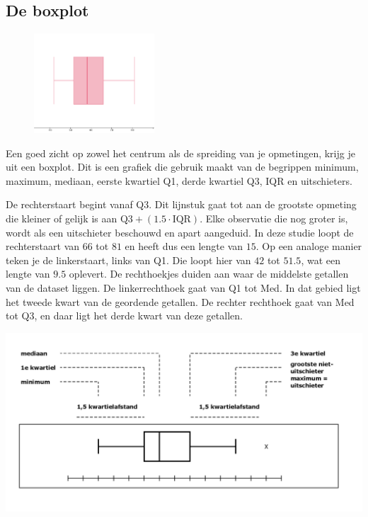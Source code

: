 \documentclass[12pt,twoside,a4paper]{article}
\begin{document}
\needspace{8cm}
\subsection{De boxplot}

\begin{figure}
  \vspace{-1cm}
  \includegraphics[width=0.4\textwidth]{boxplot}
\end{figure}

Een goed zicht op zowel het centrum als de spreiding van je opmetingen, krijg je uit een boxplot. Dit
is een grafiek die gebruik maakt van de begrippen minimum, maximum, mediaan, eerste kwartiel
Q1, derde kwartiel Q3, IQR en uitschieters.

De rechterstaart begint vanaf Q3. Dit lijnstuk gaat tot aan de grootste opmeting die kleiner of
gelijk is aan $\mbox{Q3} + (1.5\cdot\mbox{IQR})$. Elke observatie die nog groter is, wordt als een uitschieter
beschouwd en apart aangeduid. In deze studie loopt de rechterstaart van $66$ tot $81$ en heeft
dus een lengte van $15$. Op een analoge manier teken je de linkerstaart, links van Q1. Die
loopt hier van $42$ tot $51.5$, wat een lengte van $9.5$ oplevert.
De rechthoekjes duiden aan waar de middelste getallen van de dataset liggen. De
linkerrechthoek gaat van Q1 tot Med. In dat gebied ligt het tweede kwart van de geordende
getallen. De rechter rechthoek gaat van Med tot Q3, en daar ligt het derde kwart van deze
getallen.

\begin{center}
  \includegraphics[width=\textwidth]{boxplot-schema}
\end{center}
\end{document}

